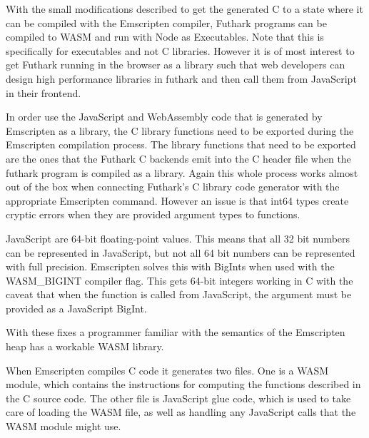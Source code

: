 \documentclass[11pt]{book}
\begin{document}
With the small modifications described to get the generated C to a state where it can be compiled with the Emscripten compiler, Futhark programs can be compiled to WASM and run with Node as Executables. Note that this is specifically for executables and not C libraries. However it is of most interest to get Futhark running in the browser as a library such that web developers can design high performance libraries in futhark and then call them from JavaScript in their frontend. 



In order use the JavaScript and WebAssembly code that is generated by Emscripten as a library, the C library functions need to be exported during the Emscripten compilation process. The library functions that need to be exported are the ones that the Futhark C backends emit into the C header file when the futhark program is compiled as a library. Again this whole process works almost out of the box when connecting Futhark's C library code generator with the appropriate Emscripten command. However an issue is that int64 types create cryptic errors when they are provided argument types to functions. 

JavaScript are 64-bit floating-point values. This means that all 32 bit numbers can be represented in JavaScript, but not all 64 bit numbers can be represented with full precision.
%
Emscripten solves this with BigInts when used with the WASM\_BIGINT compiler flag. This gets 64-bit integers working in C with the caveat that when the function is called from JavaScript, the argument must be provided as a JavaScript BigInt.

With these fixes a programmer familiar with the semantics of the Emscripten heap has a workable WASM library.

When Emscripten compiles C code it generates two files. One is a WASM module, which contains the instructions for computing the functions described in the C source code. The other file is JavaScript glue code, which is used to take care of loading the WASM file, as well as handling any JavaScript calls that the WASM module might use.
\end{document}
